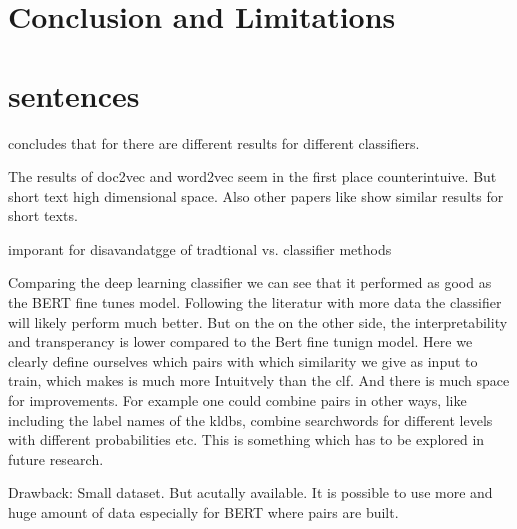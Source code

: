 \documentclass[12pt, a4paper, titlepage]{article}
\begin{document}
  

\section{Conclusion and Limitations}
\section{sentences}
\citet{ajose2020} concludes that for there are different results for different classifiers. 

\citet{singh2022} The results of doc2vec and word2vec seem in the first place counterintuive. But short text high dimensional space. Also other papers like \citet{singh2022} show similar results for short texts.


\citet{gonzalez2020} imporant for disavandatgge of tradtional vs. classifier methods


Comparing the deep learning classifier we can see that it performed as good as the BERT fine tunes model. Following the literatur with more data the classifier will likely perform much better. But on the on the other side, the interpretability and transperancy is lower compared to the Bert fine tunign model. Here we clearly define ourselves which pairs with which similarity we give as input to train, which makes is much more Intuitvely than the clf. And there is much space for improvements. For example one could combine pairs in other ways, like including the label names of the kldbs, combine searchwords for different levels with different probabilities etc. This is something which has to be explored in future research. 



Drawback: Small dataset. But acutally available. It is possible to use more and huge amount of data especially for BERT where pairs are built. 
\clearpage
\end{document}
